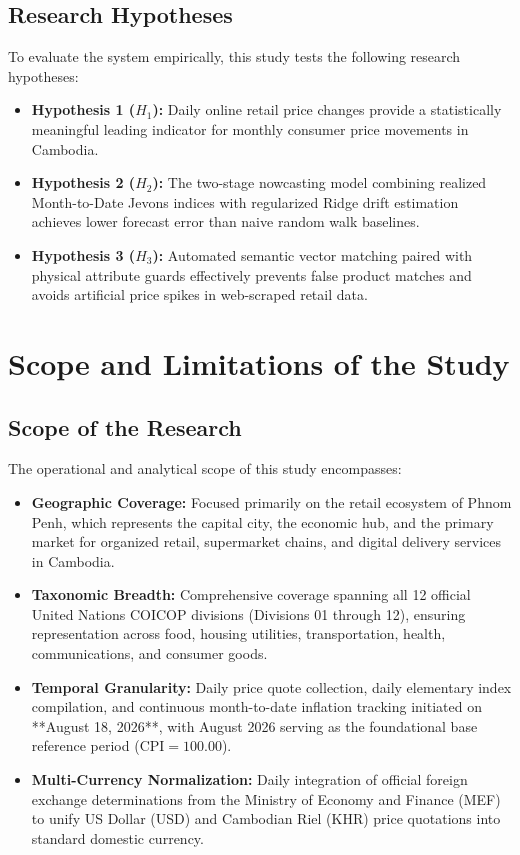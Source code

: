 \subsection{Research Hypotheses}
\hs To evaluate the system empirically, this study tests the following research hypotheses:
\begin{itemize}
    \item \textbf{Hypothesis 1 ($H_1$):} Daily online retail price changes provide a statistically meaningful leading indicator for monthly consumer price movements in Cambodia.
    \item \textbf{Hypothesis 2 ($H_2$):} The two-stage nowcasting model combining realized Month-to-Date Jevons indices with regularized Ridge drift estimation achieves lower forecast error than naive random walk baselines.
    \item \textbf{Hypothesis 3 ($H_3$):} Automated semantic vector matching paired with physical attribute guards effectively prevents false product matches and avoids artificial price spikes in web-scraped retail data.
\end{itemize}

\section{Scope and Limitations of the Study}

\subsection{Scope of the Research}
\hs The operational and analytical scope of this study encompasses:
\begin{itemize}
    \item \textbf{Geographic Coverage:} Focused primarily on the retail ecosystem of Phnom Penh, which represents the capital city, the economic hub, and the primary market for organized retail, supermarket chains, and digital delivery services in Cambodia.
    \item \textbf{Taxonomic Breadth:} Comprehensive coverage spanning all 12 official United Nations COICOP divisions (Divisions 01 through 12), ensuring representation across food, housing utilities, transportation, health, communications, and consumer goods.
    \item \textbf{Temporal Granularity:} Daily price quote collection, daily elementary index compilation, and continuous month-to-date inflation tracking initiated on **August 18, 2026**, with August 2026 serving as the foundational base reference period ($\text{CPI} = 100.00$).
    \item \textbf{Multi-Currency Normalization:} Daily integration of official foreign exchange determinations from the Ministry of Economy and Finance (MEF) to unify US Dollar (USD) and Cambodian Riel (KHR) price quotations into standard domestic currency.
\end{itemize}

